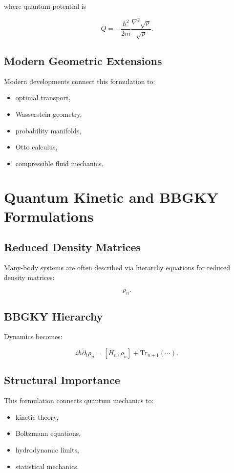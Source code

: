 \documentclass[11pt]{article}
\begin{document}
where quantum potential is

\[
Q
=
-
\frac{\hbar^2}{2m}
\frac{\nabla^2\sqrt{\rho}}
{\sqrt{\rho}}.
\]

\subsection{Modern Geometric Extensions}

Modern developments connect this formulation to:

\begin{itemize}
\item optimal transport,
\item Wasserstein geometry,
\item probability manifolds,
\item Otto calculus,
\item compressible fluid mechanics.
\end{itemize}

\section{Quantum Kinetic and BBGKY Formulations}

\subsection{Reduced Density Matrices}

Many-body systems are often described via hierarchy equations for reduced density matrices:

\[
\rho_n.
\]

\subsection{BBGKY Hierarchy}

Dynamics becomes:

\[
i\hbar
\partial_t \rho_n
=
[H_n,\rho_n]
+
\mathrm{Tr}_{n+1}
(\cdots).
\]

\subsection{Structural Importance}

This formulation connects quantum mechanics to:

\begin{itemize}
\item kinetic theory,
\item Boltzmann equations,
\item hydrodynamic limits,
\item statistical mechanics.
\end{itemize}
\end{document}
